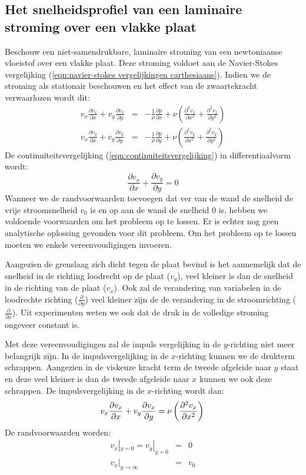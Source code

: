 		\subsection{Het snelheidsprofiel van een laminaire stroming over een vlakke plaat}
Beschouw een niet-samendrukbare, laminaire stroming van een newtoniaanse vloeistof over een vlakke plaat. Deze stroming voldoet aan de Navier-Stokes vergelijking (\ref{eqn:navier-stokes vergelijkingen carthesiaans}). Indien we de stroming als stationair beschouwen en het effect van de zwaartekracht verwaarlozen wordt dit:
\begin{eqnarray}
	v_x \frac{\partial v_x}{\partial x} + v_y \frac{\partial v_x}{\partial y} &=& -\frac{1}{\rho}\frac{\partial p}{\partial x} + \nu \left( \frac{\partial^2 v_x}{\partial x^2} + \frac{\partial^2 v_x}{\partial y^2} \right) \\
	v_x \frac{\partial v_y}{\partial x} + v_y \frac{\partial v_y}{\partial y} &=& -\frac{1}{\rho}\frac{\partial p}{\partial y} + \nu \left( \frac{\partial^2 v_y}{\partial x^2} + \frac{\partial^2 v_y}{\partial y^2} \right)
\end{eqnarray}
De continuïteitsvergelijking (\ref{eqn:continuiteitsvergelijking}) in differentiaalvorm wordt:
\begin{equation}
	\frac{\partial v_x}{\partial x} + \frac{\partial v_y}{\partial y} = 0
\end{equation}
Wanneer we de randvoorwaarden toevoegen dat ver van de wand de snelheid de vrije stroomsnelheid $v_0$ is en op aan de wand de snelheid 0 is, hebben we voldoende voorwaarden om het probleem op te lossen. Er is echter nog geen analytische oplossing gevonden voor dit probleem. Om het probleem op te lossen moeten we enkele vereenvoudigingen invoeren. 

Aangezien de grenslaag zich dicht tegen de plaat bevind is het aannemelijk dat de snelheid in de richting loodrecht op de plaat ($v_y$), veel kleiner is dan de snelheid in de richting van de plaat ($v_x$). Ook zal de verandering van variabelen in de loodrechte richting ($\frac{\partial}{\partial y}$) veel kleiner zijn de de verandering in de stroomrichting ($\frac{\partial}{\partial x}$). Uit experimenten weten we ook dat de druk in de volledige stroming ongeveer constant is. 

Met deze vereenvoudigingen zal de impuls vergelijking in de $y$-richting niet meer belangrijk zijn. In de impulsvergelijking in de $x$-richting kunnen we de drukterm schrappen. Aangezien in de viskeuze kracht term de tweede afgeleide naar $y$ staat en deze veel kleiner is dan de tweede afgeleide naar $x$ kunnen we ook deze schrappen. De impulsvergelijking in de $x$-richting wordt dan:
\begin{equation}
	v_x \frac{\partial v_x}{\partial x} + v_y \frac{\partial v_x}{\partial y} = \nu \left( \frac{\partial^2 v_x}{\partial x^2} \right) \\
\end{equation}
De randvoorwaarden worden:
\begin{eqnarray}
	v_x|_{y=0} = v_y|_{y=0} &=& 0 \\
	v_x|_{y\rightarrow\infty} &=& v_0
\end{eqnarray}

